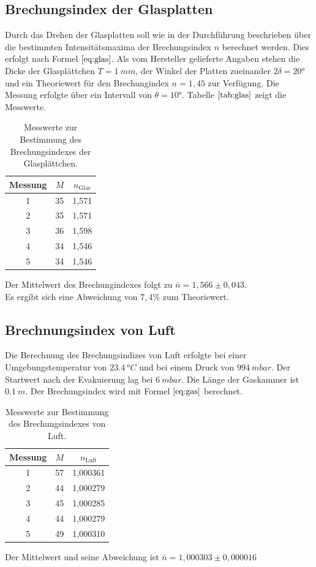 \subsection{Brechungsindex der Glasplatten}
Durch das Drehen der Glasplatten soll wie in der Durchführung beschrieben über die bestimmten Intensitätsmaxima
der Brechungsindex $n$ berechnet werden.
Dies erfolgt nach Formel $\ref{eq:glas}$.
Als vom Hersteller gelieferte Angaben stehen die Dicke der Glasplättchen $T=\SI{1}{mm}$, der Winkel der Platten zueinander $2\delta=20°$ und ein Theoriewert für
den Brechungindex $n= 1,45$ zur Verfügung.
Die Messung erfolgte über ein Intervall von $\theta = 10°$.
Tabelle $\ref{tab:glas}$ zeigt die Messwerte.

\begin{table}[H]
\centering
\begin{tabular}{c c c}
{Messung} & {$M$} & {$n_\text{Glas}$} \\
\midrule
1 & 35 & 1,571 \\
2 & 35 & 1,571 \\
3 & 36 & 1,598 \\
4 & 34 & 1,546 \\
5 & 34 & 1,546 \\
\end{tabular}
\caption{Messwerte zur Bestimmung des Brechungsindexes der Glasplättchen.}
\label{tab:glas}
\end{table}
Der Mittelwert des Brechungindexes folgt zu $\bar{n}=1,566 \pm 0,043$.\\
Es ergibt sich eine Abweichung von $7,4 \%$ zum Theoriewert.

\subsection{Brechnungsindex von Luft}
Die Berechnung des Brechungsindizes von Luft erfolgte bei einer Umgebungstemperatur von $\SI{23,4}{°C}$ und bei einem Druck von $\SI{994}{mbar}$.
Der Startwert nach der Evakuierung lag bei $\SI{6}{mbar}$.
Die Länge der Gaskammer ist $\SI{0,1}{m}$.
Der Brechungsindex wird mit Formel $\ref{eq:gas}$ berechnet.
\begin{table}[H]
\centering
\begin{tabular}{c c c}
{Messung} & {$M$} & {$n_\text{Luft}$} \\
\midrule
1 & 57 & 1,000361 \\
2 & 44 & 1,000279 \\
3 & 45 & 1,000285 \\
4 & 44 & 1,000279 \\
5 & 49 & 1,000310 \\
\end{tabular}
\caption{Messwerte zur Bestimmung des Brechungsindexes von Luft.}
\label{tab:luft}
\end{table}
Der Mittelwert und seine Abweichung ist $\bar{n}= 1,000303 \pm 0,000016$
